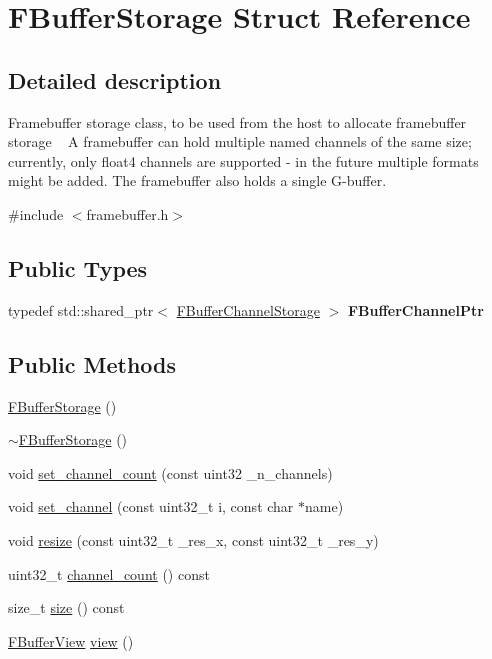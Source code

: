 \hypertarget{struct_f_buffer_storage}{}\section{F\+Buffer\+Storage Struct Reference}
\label{struct_f_buffer_storage}


\subsection{Detailed description}
Framebuffer storage class, to be used from the host to allocate framebuffer storage ~\newline
 A framebuffer can hold multiple named channels of the same size; currently, only float4 channels are supported -\/ in the future multiple formats might be added. The framebuffer also holds a single G-\/buffer. 

{\ttfamily \#include $<$framebuffer.\+h$>$}

\subsection*{Public Types}
\begin{DoxyCompactItemize}
\item 
\mbox{\label{struct_f_buffer_storage_a41cb40d12744352ecd6b7dc692a2c8d7}} 
typedef std\+::shared\+\_\+ptr$<$ \hyperlink{struct_f_buffer_channel_storage}{F\+Buffer\+Channel\+Storage} $>$ {\bfseries F\+Buffer\+Channel\+Ptr}
\end{DoxyCompactItemize}
\subsection*{Public Methods}
\begin{DoxyCompactItemize}
\item 
\hyperlink{struct_f_buffer_storage_a1d6dd4cf26b48a443630dc5bae600de8}{F\+Buffer\+Storage} ()
\item 
\hyperlink{struct_f_buffer_storage_aede7c430086652b41d3dddc9e86d4ac3}{$\sim$\+F\+Buffer\+Storage} ()
\item 
void \hyperlink{struct_f_buffer_storage_aa42c75b3dbc7cbe99d0ab6a9a49f179b}{set\+\_\+channel\+\_\+count} (const uint32 \+\_\+n\+\_\+channels)
\item 
void \hyperlink{struct_f_buffer_storage_a6996d5c41b3201156b7fa6f845007bad}{set\+\_\+channel} (const uint32\+\_\+t i, const char $\ast$name)
\item 
void \hyperlink{struct_f_buffer_storage_a026cdc839ecd1ae6e63c390832e1290d}{resize} (const uint32\+\_\+t \+\_\+res\+\_\+x, const uint32\+\_\+t \+\_\+res\+\_\+y)
\item 
uint32\+\_\+t \hyperlink{struct_f_buffer_storage_a6aa8a384578e7e99acea4cfdd194e2a4}{channel\+\_\+count} () const
\item 
size\+\_\+t \hyperlink{struct_f_buffer_storage_a3b5a5c5f7aa80d8dc8e34f34cba1e6fc}{size} () const
\item 
\hyperlink{struct_f_buffer_view}{F\+Buffer\+View} \hyperlink{struct_f_buffer_storage_a68f01c04fecd7e6293cfafcf2cc0b719}{view} ()
\end{DoxyCompactItemize}
